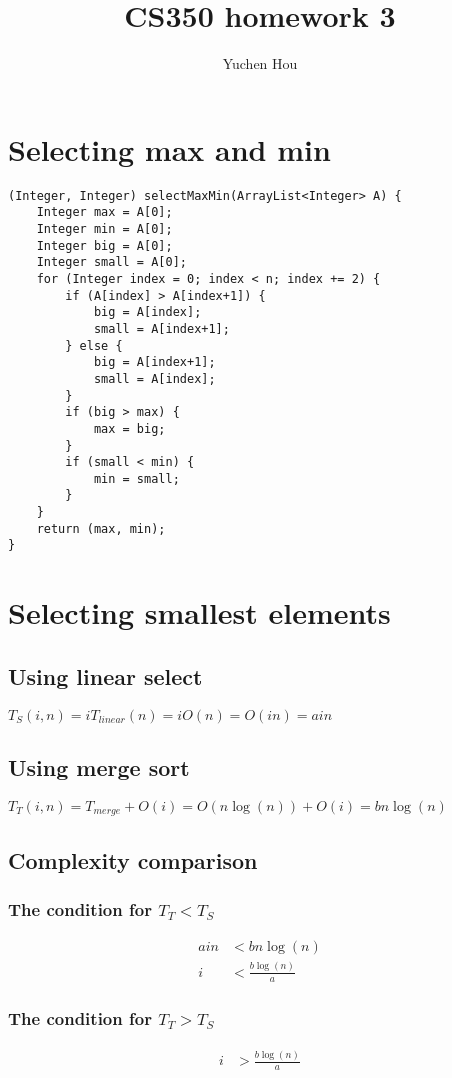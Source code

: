 \documentclass{article}
\begin{document}
\lstset{language=Java, tabsize=4}
\title{CS350 homework 3}
\author{Yuchen Hou}
\maketitle

\section{Selecting max and min}
\begin{lstlisting}
(Integer, Integer) selectMaxMin(ArrayList<Integer> A) {
	Integer max = A[0];
	Integer min = A[0];
	Integer big = A[0];
	Integer small = A[0];
	for (Integer index = 0; index < n; index += 2) {
		if (A[index] > A[index+1]) {
			big = A[index];
			small = A[index+1];
		} else {
			big = A[index+1];
			small = A[index];
		}
		if (big > max) {
			max = big;
		}
		if (small < min) {
			min = small;
		}
	}
	return (max, min);
}
\end{lstlisting}

\section{Selecting smallest elements}
\subsection{Using linear select}
$T_S(i, n) = i T_{linear}(n) = i O(n) = O(in) = a i n$
\subsection{Using merge sort}
$T_T(i, n) = T_{merge} + O(i) = O(n \log (n)) + O(i) = b n \log(n)$
\subsection{Complexity comparison}
\subsubsection{The condition for $T_T < T_S$}
\begin{align*}
ain &< b n \log(n)\\
i &< \frac{b\log(n)}{a}
\end{align*}
\subsubsection{The condition for $T_T > T_S$}
\begin{align*}
i &> \frac{b\log(n)}{a}
\end{align*}
\end{document}
